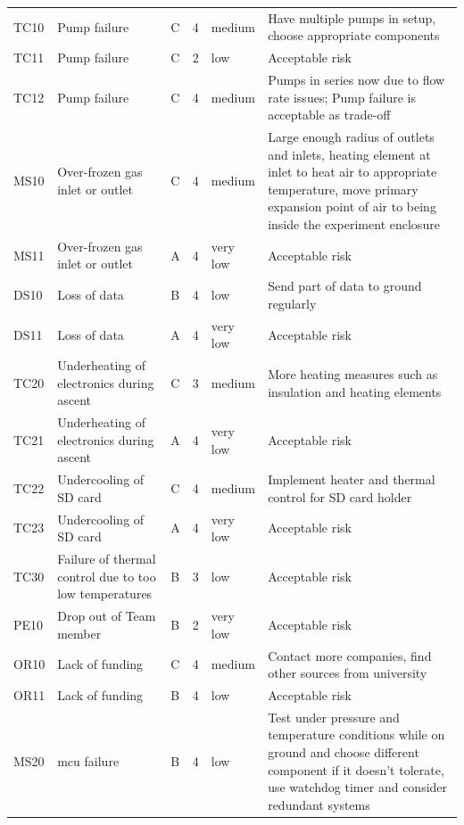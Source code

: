 \begin{longtable}{L{1.5cm}L{3cm}L{1cm}L{1cm}L{2cm}L{6cm}}
 TC10 & Pump failure & C & 4 & medium & Have multiple pumps in setup, choose appropriate components \\
 TC11 & Pump failure & C & 2 & low &  Acceptable risk \\
 TC12 & Pump failure & C & 4 & medium & Pumps in series now due to flow rate issues; Pump failure is acceptable as trade-off \\
 MS10 & Over-frozen gas inlet or outlet & C & 4 & medium & Large enough radius of outlets and inlets, heating element at inlet to heat air to appropriate temperature, move primary expansion point of air to being inside the experiment enclosure \\
 MS11 & Over-frozen gas inlet or outlet & A & 4 & very low & Acceptable risk \\
 DS10 & Loss of data & B & 4 & low & Send part of data to ground regularly \\
 DS11 & Loss of data & A & 4 & very low & Acceptable risk \\
 TC20 & Underheating of electronics during ascent & C & 3 & medium & More heating measures such as insulation and heating elements \\
 TC21 & Underheating of electronics during ascent & A & 4 & very low & Acceptable risk \\
 TC22 & Undercooling of SD card & C & 4 & medium & Implement heater and thermal control for SD card holder \\
 TC23 & Undercooling of SD card & A & 4 & very low & Acceptable risk \\
 TC30 & Failure of thermal control due to too low temperatures & B & 3 & low & Acceptable risk\\
 PE10 & Drop out of Team member & B & 2 & very low & Acceptable risk \\
 OR10 & Lack of funding & C & 4 & medium & Contact more companies, find other sources from university \\
 OR11 & Lack of funding & B & 4 & low & Acceptable risk  \\
 MS20 & \gls{mcu} failure & B & 4 & low & Test under pressure and temperature conditions while on ground and choose different component if it doesn't tolerate, use watchdog timer and consider redundant systems\\

\end{longtable}
